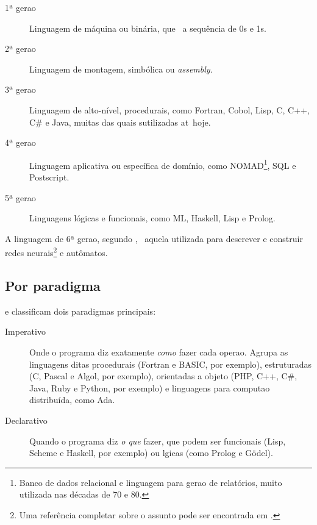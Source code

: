 \begin{description}
\item[1ª gera\ca o] Linguagem de m\'aquina ou bin\'aria, que \eh\ a sequ\^encia de 0s e 1s.
\item[2ª gera\ca o] Linguagem de montagem, simb\'olica ou \emph{assembly}.
\item[3ª gera\ca o] Linguagem de alto-n\'ivel, procedurais, como Fortran, Cobol, Lisp, C, C++, C\# e Java, muitas das quais s\ao utilizadas at\eh\ hoje.
\item[4ª gera\ca o] Linguagem aplicativa ou espec\'ifica de dom\'inio, como NOMAD\footnote{Banco de dados relacional e linguagem para gera\ca o de relat\'orios, muito utilizada nas d\'ecadas de 70 e 80.}, SQL e Postscript.
\item[5ª gera\ca o] Linguagens l\'ogicas e funcionais, como ML, Haskell, Lisp e Prolog.
\end{description}

A linguagem de 6ª gera\ca o, segundo \cite{wiki:lingprog}, \eh\ aquela utilizada para descrever e construir redes neurais\footnote{Uma refer\^encia completar sobre o assunto pode ser encontrada em \cite{wiki:redesneurais}.} e aut\^omatos.

\subsection{Por paradigma}

\cite{Aho08} e \cite{wiki:lingprog} classificam dois paradigmas principais:

\begin{description}
\item[Imperativo] Onde o programa diz exatamente \emph{como} fazer cada opera\ca o. Agrupa as linguagens ditas procedurais (Fortran e BASIC, por exemplo), estruturadas (C, Pascal e Algol, por exemplo), orientadas a objeto (PHP, C++, C\#, Java, Ruby e Python, por exemplo) e linguagens para computa\ca o distribu\'ida, como Ada.
\item[Declarativo] Quando o programa diz \emph{o que} fazer, que podem ser funcionais (Lisp, Scheme e Haskell, por exemplo) ou l\oh gicas (como Prolog e G\"odel).\\[2.5cm]
\end{description}


